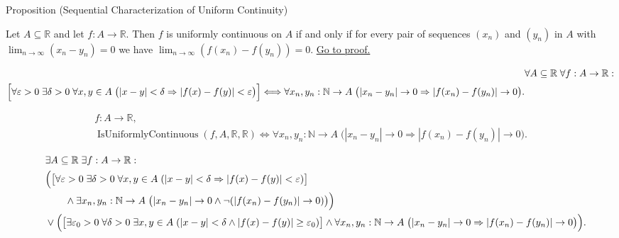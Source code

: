 \begin{propositionbox}{Proposition (Sequential Characterization of Uniform Continuity)}
\begin{proposition}
\label{prop:sequential-uniform-continuity}
Let $A \subseteq \mathbb{R}$ and let $f:A \to \mathbb{R}$. Then $f$ is uniformly continuous on $A$ if and only if for every pair of sequences $(x_n)$ and $(y_n)$ in $A$ with $\lim_{n \to \infty} (x_n - y_n) = 0$ we have $\lim_{n \to \infty} (f(x_n) - f(y_n)) = 0$.
\hyperref[prf:sequential-uniform-continuity]{Go to proof.}
\end{proposition}
\end{propositionbox}

\begin{remark*}
\[
\begin{aligned}
&\forall A \subseteq \mathbb{R}\;\forall f:A \to \mathbb{R}:\\
\Bigl[\forall \varepsilon>0\;\exists \delta>0\;\forall x,y\in A\;
\bigl(|x-y|<\delta\Rightarrow |f(x)-f(y)|<\varepsilon\bigr)\Bigr]
\Longleftrightarrow
\forall x_n,y_n:\mathbb{N} \to A\;
\bigl(|x_n - y_n| \to 0 \Rightarrow |f(x_n) - f(y_n)| \to 0\bigr).
\end{aligned}
\]
\end{remark*}

\begin{remark*}
\[
\begin{aligned}
  f\colon A\to\mathbb{R},\\
\operatorname{IsUniformlyContinuous}(f,A,\mathbb R,\mathbb R)
\Longleftrightarrow
\forall x_n,y_n:\mathbb{N} \to A\;
\bigl(|x_n - y_n| \to 0 \Rightarrow |f(x_n) - f(y_n)| \to 0\bigr).
\end{aligned}
\]
\end{remark*}

\begin{remark*}
\[
\begin{aligned}
&\exists A \subseteq \mathbb{R}\;\exists f:A \to \mathbb{R}:\\
\quad &\Bigl(
\bigl[\forall \varepsilon>0\;\exists \delta>0\;\forall x,y\in A\;
(|x-y|<\delta\Rightarrow |f(x)-f(y)|<\varepsilon)\bigr]\\
&\qquad\land \exists x_n,y_n:\mathbb{N}\to A\;
\bigl(|x_n - y_n| \to 0 \land \neg(|f(x_n) - f(y_n)| \to 0)\bigr)\Bigr)\\
\quad &\lor \Bigl(
\bigl[\exists \varepsilon_0>0\;\forall \delta>0\;\exists x,y\in A\;
(|x-y|<\delta\land |f(x)-f(y)|\ge\varepsilon_0)\bigr]\land
\forall x_n,y_n:\mathbb{N}\to A\;
\bigl(|x_n - y_n| \to 0 \Rightarrow |f(x_n) - f(y_n)| \to 0\bigr)\Bigr).
\end{aligned}
\]
\end{remark*}

